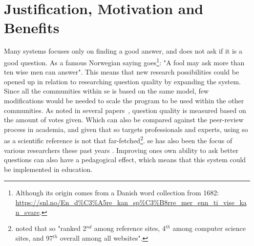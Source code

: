 \section{Justification, Motivation and Benefits}
\label{sec:justification}
Many systems focuses only on finding a good answer, and does not ask if it is a good question.
As a famous Norwegian saying goes\footnote{
	Although its origin comes from a Danish word collection from 1682: 
	\url{https://snl.no/En\_d\%C3\%A5re_kan_sp\%C3\%B8rre_mer_enn_ti_vise_kan_svare}.
}: "A fool may ask more than ten wise men can answer".
This means that new research possibilities could be opened up in relation to researching question quality by expanding the system. 
Since all the communities within \gls{se} is based on the same model, few modifications would be needed to scale the program to be used within the other communities.
As noted in several papers~, question quality is measured based on the amount of votes given. 
Which can also be compared against the peer-review process in academia, and given that \gls{so} targets professionals and experts, 
using \gls{so} as a scientific reference is not that far-fetched\footnote{
	 \citet[p.~1]{Posnett2012} noted that \gls{so} "ranked 2$^{nd}$ among reference sites, 4$^{th}$ among computer science sites, and 97$^{th}$ overall among all websites".
	 }.
\gls{se} has also been the focus of various researchers these past years \cite{Vasilescu2012}.
Improving ones own ability to ask better questions can also have a pedagogical effect, which means that this system could be implemented in education. 

